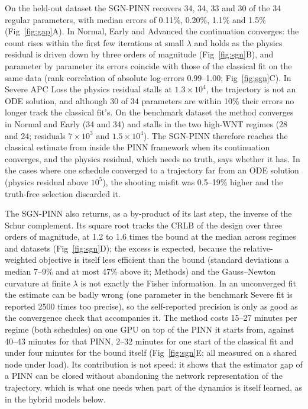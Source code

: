 On the held-out dataset the SGN-PINN recovers 34, 34, 33 and 30 of the 34
regular parameters, with median errors of 0.11\%, 0.20\%, 1.1\% and 1.5\%
(Fig~\ref{fig:gap}A). In Normal, Early and Advanced the continuation converges:
the count rises within the first few iterations at small $\lambda$ and holds as
the physics residual is driven down by three orders of magnitude
(Fig~\ref{fig:sgn}B), and parameter by parameter its errors coincide with those
of the classical fit on the same data (rank correlation of absolute log-errors 0.99--1.00;
Fig~\ref{fig:sgn}C). In Severe APC Loss the physics residual stalls at
$1.3\times10^4$, the trajectory is not an ODE solution, and although 30 of 34
parameters are within 10\% their errors no longer track the classical fit's.
On the benchmark dataset the method converges in Normal and Early (34 and 34)
and stalls in the two high-WNT regimes (28 and 24; residuals $7\times10^3$ and
$1.5\times10^4$). The SGN-PINN therefore reaches the classical estimate from
inside the PINN framework when its continuation converges, and the physics
residual, which needs no truth, says whether it has. In the cases where one
schedule converged to a trajectory far from an ODE solution (physics residual
above $10^5$), the shooting misfit was 0.5--19\% higher and the truth-free
selection discarded it.

The SGN-PINN also returns, as a by-product of its last step, the inverse of the
Schur complement. Its square root tracks the CRLB of the design over three
orders of magnitude, at 1.2 to 1.6 times the bound at the median across regimes
and datasets (Fig~\ref{fig:sgn}D); the excess is expected, because the
relative-weighted objective is itself less efficient than the bound (standard deviations a median 7--9\% and at most 47\% above it;
Methods) and the Gauss--Newton curvature at finite $\lambda$ is not exactly the
Fisher information. In an unconverged fit the estimate can be badly wrong (one
parameter in the benchmark Severe fit is reported 2500 times too precise), so
the self-reported precision is only as good as the convergence check that
accompanies it. The method costs 15--27 minutes per regime (both schedules) on one GPU on top
of the PINN it starts from, against 40--43 minutes for that PINN, 2--32 minutes
for one start of the classical fit and under four minutes for the bound itself
(Fig~\ref{fig:sgn}E; all measured on a shared node under load). Its contribution is not speed: it shows that the
estimator gap of a PINN can be closed without abandoning the network
representation of the trajectory, which is what one needs when part of the
dynamics is itself learned, as in the hybrid models below.

